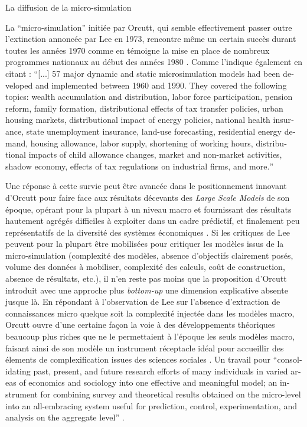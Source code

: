 \begin{framewithtitle}{ La diffusion de la micro-simulation } 

La \enquote{micro-simulation} initiée par Orcutt, qui semble effectivement passer outre l'extinction annoncée par Lee en 1973, rencontre même un certain succès durant toutes les années 1970 comme en témoigne la mise en place de nombreux programmes nationaux au début des années 1980 \autocites{Merz1991, Merz1994, Baroni2007}. Comme l'indique également \textcite{Boman2005} en citant \textcite{Merz1991} : \foreignquote{english}{[...] 57 major dynamic and static microsimulation models had been developed and implemented between 1960 and 1990. They covered the following topics: wealth accumulation and distribution, labor force participation, pension reform, family formation, distributional effects of tax transfer policies, urban housing markets, distributional impact of energy policies, national health insurance, state unemployment insurance, land-use forecasting, residential energy demand, housing allowance, labor supply, shortening of working hours, distributional impacts of child allowance changes, market and non-market activities, shadow economy, effects of tax regulations on industrial firms, and more.}

Une réponse à cette survie peut être avancée dans le positionnement innovant d'Orcutt pour faire face aux résultats décevants des \textit{Large Scale Models} de son époque, opérant pour la plupart à un niveau macro et fournissant des résultats hautement agrégés difficiles à exploiter dans un cadre prédictif, et finalement peu représentatifs de la diversité des systèmes économiques \autocites{Birkin2012, Baroni2007}. Si les critiques de Lee peuvent pour la plupart être mobilisées pour critiquer les modèles issus de la micro-simulation (complexité des modèles, absence d'objectifs clairement posés, volume des données à mobiliser, complexité des calculs, coût de construction, absence de résultats, etc.), il n'en reste pas moins que la proposition d'Orcutt introduit avec une approche plus \textit{bottom-up} une dimension explicative absente jusque là. En répondant à l'observation de Lee sur l'absence d'extraction de connaissances micro quelque soit la complexité injectée dans les modèles macro, Orcutt ouvre d'une certaine façon la voie à des développements théoriques beaucoup plus riches que ne le permettaient à l'époque les seuls modèles macro, faisant ainsi de son modèle un instrument réceptacle idéal pour accueillir des élements de complexification issues des sciences sociales \autocite[19]{Czajka1993}. Un travail pour \foreignquote{english}{consolidating past, present, and future research efforts of many individuals in varied areas of economics and sociology into one effective and meaningful model; an instrument for combining survey and theoretical results obtained on the micro-level into an all-embracing system useful for prediction, control, experimentation, and analysis on the aggregate level} \autocite[122]{Cohen1961}.


\end{framewithtitle}
